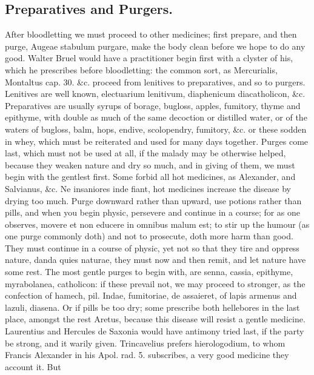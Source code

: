 \subsection{Preparatives and Purgers.}

After bloodletting we must proceed to other medicines; first prepare,
and then purge, Augeae stabulum purgare, make the body clean before we
hope to do any good. Walter Bruel would have a practitioner begin first
with a clyster of his, which he prescribes before bloodletting: the
common sort, as Mercurialis, Montaltus cap. 30. \&c. proceed from
lenitives to preparatives, and so to purgers. Lenitives are well known,
electuarium lenitivum, diaphenicum diacatholicon, \&c. Preparatives are
usually syrups of borage, bugloss, apples, fumitory, thyme and
epithyme, with double as much of the same decoction or distilled water,
or of the waters of bugloss, balm, hops, endive, scolopendry, fumitory,
\&c. or these sodden in whey, which must be reiterated and used for many
days together. Purges come last, which must not be used at all, if the
malady may be otherwise helped, because they weaken nature and dry so
much, and in giving of them,  we must begin with the gentlest
first. Some forbid all hot medicines, as Alexander, and Salvianus, \&c.
Ne insaniores inde fiant, hot medicines increase the disease by
drying too much. Purge downward rather than upward, use potions rather
than pills, and when you begin physic, persevere and continue in a
course; for as one observes, movere et non educere in omnibus
malum est; to stir up the humour (as one purge commonly doth) and not
to prosecute, doth more harm than good. They must continue in a course
of physic, yet not so that they tire and oppress nature, danda quies
naturae, they must now and then remit, and let nature have some rest.
The most gentle purges to begin with, are senna, cassia,
epithyme, myrabolanea, catholicon: if these prevail not, we may proceed
to stronger, as the confection of hamech, pil. Indae, fumitoriae, de
assaieret, of lapis armenus and lazuli, diasena. Or if pills be too
dry; some prescribe both hellebores in the last place, amongst
the rest Aretus, because this disease will resist a gentle
medicine. Laurentius and Hercules de Saxonia would have antimony tried
last, if the party be strong, and it warily given.
Trincavelius prefers hierologodium, to whom Francis Alexander in
his Apol. rad. 5. subscribes, a very good medicine they account it. But
